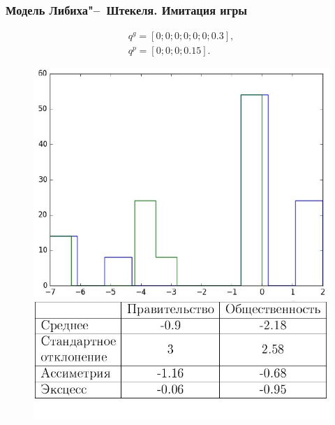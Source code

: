 \documentclass {beamer}
\begin{document}
\begin{frame}
\frametitle{Модель Либиха"--~Штекеля. Имитация игры}
 \begin{gather*}
 q^g = \left[ 0; 0; 0; 0; 0; 0; 0.3 \right], \\
 q^p = \left[ 0; 0; 0; 0.15 \right].
 \end{gather*}
	
	\begin{figure}
		\begin{minipage}[b]{0.45\textwidth}
			
			\includegraphics[width=\textwidth]{10th}
		\end{minipage}
		\begin{minipage}[b]{0.45\textwidth}
			
			\includegraphics[width=\textwidth]{11th}
		\end{minipage}
		
	\end{figure}
	
\end{frame}
\end{document}
